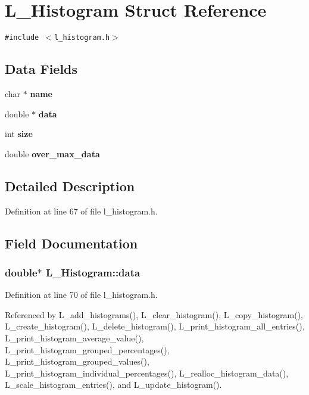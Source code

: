 \section{L\_\-Histogram Struct Reference}
\label{structL__Histogram}
{\tt \#include $<$l\_\-histogram.h$>$}

\subsection*{Data Fields}
\begin{CompactItemize}
\item 
char $\ast$ \bf{name}
\item 
double $\ast$ \bf{data}
\item 
int \bf{size}
\item 
double \bf{over\_\-max\_\-data}
\end{CompactItemize}


\subsection{Detailed Description}




Definition at line 67 of file l\_\-histogram.h.

\subsection{Field Documentation}
\subsubsection{\setlength{\rightskip}{0pt plus 5cm}double$\ast$ \bf{L\_\-Histogram::data}}\label{structL__Histogram_c5d3568bc0bea5a4fd544a129c592ba5}




Definition at line 70 of file l\_\-histogram.h.

Referenced by L\_\-add\_\-histograms(), L\_\-clear\_\-histogram(), L\_\-copy\_\-histogram(), L\_\-create\_\-histogram(), L\_\-delete\_\-histogram(), L\_\-print\_\-histogram\_\-all\_\-entries(), L\_\-print\_\-histogram\_\-average\_\-value(), L\_\-print\_\-histogram\_\-grouped\_\-percentages(), L\_\-print\_\-histogram\_\-grouped\_\-values(), L\_\-print\_\-histogram\_\-individual\_\-percentages(), L\_\-realloc\_\-histogram\_\-data(), L\_\-scale\_\-histogram\_\-entries(), and L\_\-update\_\-histogram().
